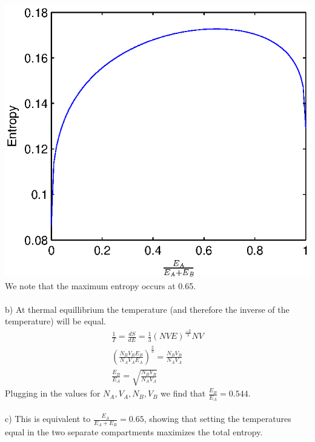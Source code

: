 \documentclass[a4paper,10pt]{article}
\numberwithin{equation}{section}
\begin{document}
\includegraphics{p1}
\\
We note that the maximum entropy occurs at 0.65.
\\ \\
b) At thermal equillibrium the temperature (and therefore the inverse of the temperature) will be equal.
\begin{gather}
 \frac{1}{T}=\frac{dS}{dE}=\frac{1}{3}(NVE)^{\frac{-2}{3}}NV\\
 \left (\frac{N_BV_BE_B}{N_AV_AE_A}\right )^{\frac{2}{3}}=\frac{N_BV_B}{N_AV_A}\\
 \frac{E_B}{E_A}=\sqrt{\frac{N_BV_B}{N_AV_A}}
\end{gather}
Plugging in the values for $N_A, V_A,N_B,V_B$ we find that $\frac{E_B}{E_A}=0.544$.
\\ \\
c) This is equivalent to $\frac{E_A}{E_A+E_B}=0.65$, 
showing that setting the temperatures equal in the two separate compartments maximizes the total entropy.
\end{document}
